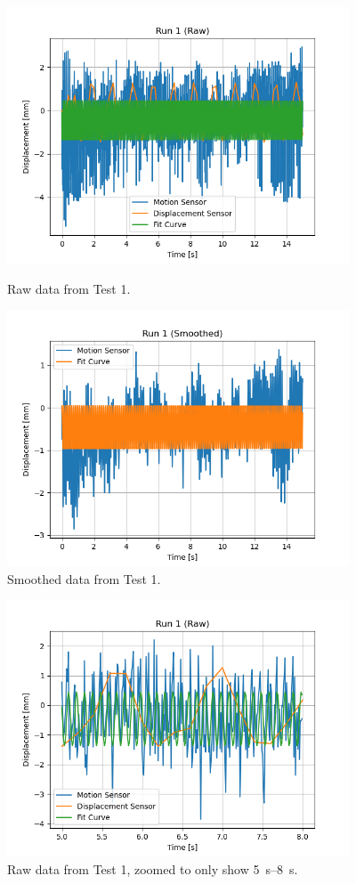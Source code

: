 \documentclass[12 pt]{report}
\begin{document}
\begin{figure}[htbp]
\centering
\includegraphics[width=4in]{images/Graphs/Run_1-Raw}
\caption{Raw data from Test \num{1}.}

\centering
\includegraphics[width=4in]{images/Graphs/Run_1-Smoothed}
\caption{Smoothed data from Test \num{1}.}
\end{figure}

\begin{figure}[htbp]
\centering
\includegraphics[width=4in]{images/Graphs/Run_1-Raw-Zoomed}
\caption{Raw data from Test \num{1}, zoomed to only show \qtyrange{5}{8}{\s}.}
\end{figure}
\end{document}
